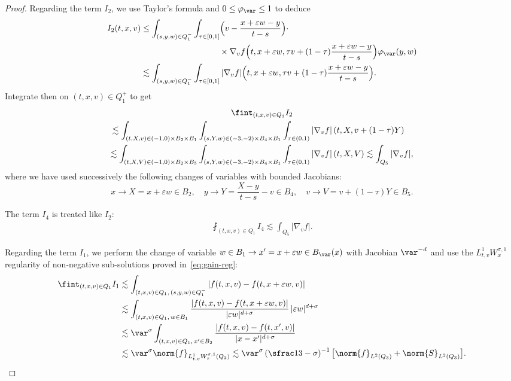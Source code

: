 \begin{proof}
Regarding the term $I_2$, we use Taylor's formula and
$0\leq \varphi_\var\leq 1$ to deduce
\begin{align*}
I_2(t,x,v)
&\leq \int_{(s,y,w) \in Q_1^{-}} \int_{\tau\in [0,1]}
\Bigl(v-\frac{x+\varepsilon w-y}{t-s}\Bigr) \cdot \\
& \hspace{3.3cm} \times \nabla_v
f \Bigl(t,x+\varepsilon w, \tau v +
(1-\tau)\frac{x+\varepsilon w-y}{t-s} \Bigr)
\varphi_\var(y,w) \\
&\lesssim \int_{(s,y,w) \in Q_1^{-}} \int_{\tau\in [0,1]}
|\nabla_v f| \Bigl(t,x+\varepsilon w, \tau v +
(1-\tau)\frac{x+\varepsilon w-y}{t-s} \Bigr).
\end{align*}
Integrate then on $(t,x,v)\in Q_{1}^+$ to get
\begin{multline}
\label{estim I2}
\fint_{(t,x,v) \in Q_1} I_2 \\
\hspace*{-3mm}\lesssim \int_{(t,X,v)\in (-1,0)\times B_2 \times
B_1} \int_{(s,Y,w)\in (-3,-2)\times B_4 \times B_1}
\int_{\tau\in (0,1)} |\nabla_v f| \left(t,X, v+ (1-\tau) Y
\right) \\
\lesssim \int_{(t,X,V)\in (-1,0)\times B_2 \times
B_5} \int_{(s,Y,w)\in (-3,-2)\times B_4 \times B_1}
\int_{\tau\in (0,1)} |\nabla_v f| \left(t,X, V\right)
\lesssim \int_{Q_5} |\nabla_v f|,
\end{multline}
where we have used successively the following changes of
variables with bounded Jacobians:
\begin{equation*}
x\to X=x+\varepsilon w \in B_2, \quad
y\to Y= \frac{X -y}{t-s} -v\in B_4, \quad
v\to V=v+(1-\tau)Y\in B_5.
\end{equation*}

The term $I_4$ is treated like $I_2$:
\begin{align}
\label{estim I4}
\fint_{(t,x,v) \in Q_1} I_4 \lesssim \int_{Q_5} |\nabla_v f|.
\end{align}

Regarding the term $I_1 $, we perform the change of variable
$w \in B_1 \to x'=x+\varepsilon w \in B_\var(x)$ with
Jacobian $\var^{-d}$ and use the $L^1_{t,v} W^{\sigma,1}_{x}$
regularity of non-negative sub-solutions proved
in~\eqref{eq:gain-reg}:\vspace*{-3pt}
\begin{equation}
\label{estim I1}
\begin{aligned}
\fint_{(t,x,v)\in Q_1} I_1
& \lesssim \int_{(t,x,v)\in Q_1, \, (s,y,w)\in Q_1^{-}}
|f(t,x,v)-f(t,x+\varepsilon w,v) | \\
&\lesssim \int_{(t,x,v)\in Q_1, \, w \in B_1}
\frac{|f(t,x,v)-f(t,x+\varepsilon w,v)|}{|\varepsilon w
|^{d+\sigma}}\,|\varepsilon w|^{d+\sigma} \\
&\lesssim \var^\sigma \int_{(t,x,v)\in Q_1, \, x' \in B_2 }
\frac{|f(t,x,v)-f(t,x',v)|}{|x-x'|^{d+\sigma}} \\
& \lesssim \var^\sigma \norm{f}_{L^1_{t,v}W^{\sigma,1}_x(Q_2)}
\lesssim \var^\sigma \left( \sfrac13 -\sigma \right)^{-1}
\bigl[ \norm{f}_{L^2(Q_3)} + \norm{S}_{L^2(Q_3)} \bigr].
\end{aligned}
\end{equation}


\end{proof}

